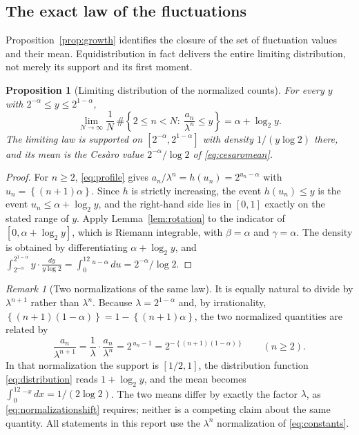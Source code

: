 \documentclass[11pt,letterpaper]{article}
\numberwithin{equation}{section}
\newtheorem{proposition}[theorem]{Proposition}
\theoremstyle{definition}
\theoremstyle{remark}
\newtheorem{remark}[theorem]{Remark}
\newcommand{\fracpart}[1]{\left\{#1\right\}}
\begin{document}
\subsection{The exact law of the fluctuations}
Proposition~\ref{prop:growth} identifies the closure of the set of
fluctuation values and their mean. Equidistribution in fact delivers the
entire limiting distribution, not merely its support and its first moment.

\begin{proposition}[Limiting distribution of the normalized counts]
\label{prop:distribution}
For every $y$ with $2^{-\alpha}\le y\le2^{1-\alpha}$,
\begin{equation}\label{eq:distribution}
 \lim_{N\to\infty}\frac1N\,
 \#\left\{2\le n<N:\ \frac{a_n}{\lambda^n}\le y\right\}
 =\alpha+\log_2y.
\end{equation}
The limiting law is supported on $[2^{-\alpha},2^{1-\alpha}]$ with density
$1/(y\log2)$ there, and its mean is the Ces\`aro value
$2^{-\alpha}/\log2$ of \eqref{eq:cesaromean}.
\end{proposition}
\begin{proof}
For $n\ge2$, \eqref{eq:profile} gives $a_n/\lambda^n=h(u_n)=2^{u_n-\alpha}$
with $u_n=\fracpart{(n+1)\alpha}$. Since $h$ is strictly increasing, the
event $h(u_n)\le y$ is the event $u_n\le\alpha+\log_2y$, and the right-hand
side lies in $[0,1]$ exactly on the stated range of $y$. Apply
Lemma~\ref{lem:rotation} to the indicator of $[0,\alpha+\log_2y]$, which is
Riemann integrable, with $\beta=\alpha$ and $\gamma=\alpha$. The density is
obtained by differentiating $\alpha+\log_2y$, and
$\int_{2^{-\alpha}}^{2^{1-\alpha}}y\cdot\frac{dy}{y\log2}
 =\int_0^12^{u-\alpha}\,du=2^{-\alpha}/\log2$.
\end{proof}

\begin{remark}[Two normalizations of the same law]\label{rem:normalization}
It is equally natural to divide by $\lambda^{n+1}$ rather than $\lambda^n$.
Because $\lambda=2^{1-\alpha}$ and, by irrationality,
$\fracpart{(n+1)(1-\alpha)}=1-\fracpart{(n+1)\alpha}$, the two normalized
quantities are related by
\begin{equation}\label{eq:normalizationshift}
 \frac{a_n}{\lambda^{n+1}}=\frac1\lambda\cdot\frac{a_n}{\lambda^n}
 =2^{\,u_n-1}=2^{-\fracpart{(n+1)(1-\alpha)}}\qquad(n\ge2).
\end{equation}
In that normalization the support is $[1/2,1]$, the distribution function
\eqref{eq:distribution} reads $1+\log_2y$, and the mean becomes
$\int_0^12^{-x}\,dx=1/(2\log2)$. The two means differ by exactly the factor
$\lambda$, as \eqref{eq:normalizationshift} requires; neither is a competing
claim about the same quantity. All statements in this report use the
$\lambda^n$ normalization of \eqref{eq:constants}.
\end{remark}
\end{document}
